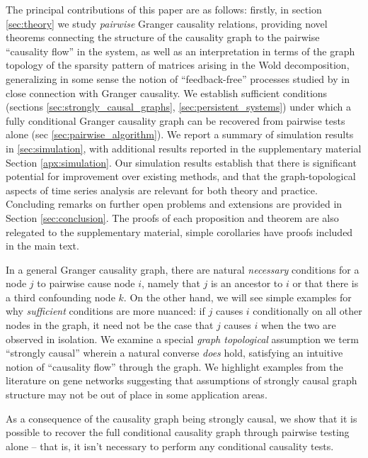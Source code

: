 \documentclass[12pt]{article}
\begin{document}
The principal contributions of this paper are as follows: firstly, in
section \ref{sec:theory} we study \textit{pairwise} Granger causality
relations, providing novel theorems connecting the structure of the
causality graph to the pairwise ``causality flow'' in the system, as
well as an interpretation in terms of the graph topology of the
sparsity pattern of matrices arising in the Wold decomposition,
generalizing in some sense the notion of ``feedback-free'' processes
studied by \cite{caines1975feedback} in close connection with
Granger causality.  We establish sufficient conditions (sections
\ref{sec:strongly_causal_graphs}, \ref{sec:persistent_systems}) under
which a fully conditional Granger causality graph can be recovered
from pairwise tests alone (sec \ref{sec:pairwise_algorithm}).  We
report a summary of simulation results in \ref{sec:simulation}, with
additional results reported in the supplementary material Section
\ref{apx:simulation}.  Our simulation results establish that there is
significant potential for improvement over existing methods, and that
the graph-topological aspects of time series analysis are relevant for
both theory and practice.  Concluding remarks on further open problems
and extensions are provided in Section \ref{sec:conclusion}.  The
proofs of each proposition and theorem are also relegated to the
supplementary material, simple corollaries have proofs included in the
main text.

In a general Granger causality graph, there are natural
\textit{necessary} conditions for a node $j$ to pairwise cause node
$i$, namely that $j$ is an ancestor to $i$ or that there is a third
confounding node $k$.  On the other hand, we will see simple examples
for why \textit{sufficient} conditions are more nuanced: if $j$ causes
$i$ conditionally on all other nodes in the graph, it need not be the
case that $j$ causes $i$ when the two are observed in isolation.  We
examine a special \textit{graph topological} assumption we term
``strongly causal'' wherein a natural converse \textit{does} hold,
satisfying an intuitive notion of ``causality flow'' through the
graph.  We highlight examples from the literature on gene networks
suggesting that assumptions of strongly causal graph structure may not
be out of place in some application areas.

As a consequence of the causality graph being strongly causal, we show
that it is possible to recover the full conditional causality graph
through pairwise testing alone -- that is, it isn't necessary to
perform any conditional causality tests.
\end{document}
